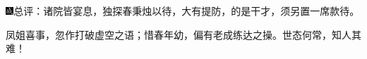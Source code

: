 {\includegraphics[width=3mm]{../Images/00005}\kaishu 总评：诸院皆宴息，独探春秉烛以待，大有提防，的是干才，须另置一席款待。}

{\kaishu 凤姐喜事，忽作打破虚空之语；惜春年幼，偏有老成练达之操。世态何常，知人其难！}






